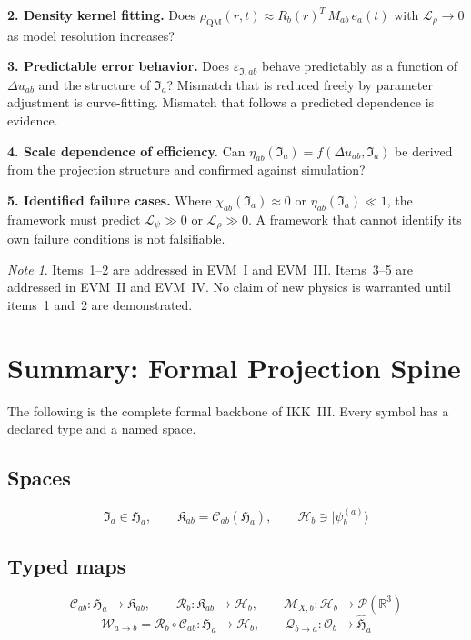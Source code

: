 \documentclass[12pt, a4paper]{article}
\theoremstyle{definition}
\theoremstyle{plain}
\theoremstyle{remark}
\newtheorem{note}{Note}[section]
\newenvironment{evidenceitem}[1]
  {\medskip\noindent\textbf{#1.}\enspace}{\medskip}
\newcommand{\Ia}{\mathfrak{I}_a}
\newcommand{\Ha}{\mathfrak{H}_a}        %
\newcommand{\Hb}{\mathcal{H}_b}         %
\newcommand{\Hahat}{\widehat{\mathfrak{H}}_a}  %
\newcommand{\Kab}{\mathfrak{K}_{ab}}    %
\newcommand{\Osp}{\mathcal{O}_b}        %
\newcommand{\ProbR}{\mathcal{P}(\mathbb{R}^3)} %
\newcommand{\Wab}{\mathcal{W}_{a\to b}}   %
\newcommand{\Qba}{\mathcal{Q}_{b\to a}}   %
\newcommand{\Cab}{\mathcal{C}_{ab}}        %
\newcommand{\Rb}{\mathcal{R}_b}            %
\newcommand{\MXb}{\mathcal{M}_{X,b}}      %
\newcommand{\psiab}{|\psi_b^{(a)}\rangle}
\newcommand{\rhoQM}{\rho_{\mathrm{QM}}}
\newcommand{\chiab}{\chi_{ab}}
\newcommand{\etaab}{\eta_{ab}}
\newcommand{\epsI}{\varepsilon_{\mathfrak{I},ab}}
\newcommand{\Lpsi}{\mathcal{L}_\psi}
\newcommand{\Lrho}{\mathcal{L}_\rho}
\newcommand{\Rbvec}{R_b(r)}
\newcommand{\eavec}{e_a(t)}
\newcommand{\Mab}{M_{ab}}
\newcommand{\Duab}{\Delta u_{ab}}
\begin{document}
\begin{evidenceitem}{2. Density kernel fitting}
Does $\rhoQM(r,t) \approx \Rbvec^T\,\Mab\,\eavec$ with
$\Lrho \to 0$ as model resolution increases?
\end{evidenceitem}

\begin{evidenceitem}{3. Predictable error behavior}
Does $\epsI$ behave predictably as a function of $\Duab$ and
the structure of $\Ia$?
Mismatch that is reduced freely by parameter adjustment is
curve-fitting.
Mismatch that follows a predicted dependence is evidence.
\end{evidenceitem}

\begin{evidenceitem}{4. Scale dependence of efficiency}
Can $\etaab(\Ia) = f(\Duab, \Ia)$ be derived from the projection
structure and confirmed against simulation?
\end{evidenceitem}

\begin{evidenceitem}{5. Identified failure cases}
Where $\chiab(\Ia) \approx 0$ or $\etaab(\Ia) \ll 1$, the
framework must predict $\Lpsi \gg 0$ or $\Lrho \gg 0$.
A framework that cannot identify its own failure conditions is
not falsifiable.
\end{evidenceitem}

\begin{note}
Items~1--2 are addressed in EVM~I and EVM~III.
Items~3--5 are addressed in EVM~II and EVM~IV.
No claim of new physics is warranted until items~1 and~2 are
demonstrated.
\end{note}


\section*{Summary: Formal Projection Spine}

The following is the complete formal backbone of IKK~III.
Every symbol has a declared type and a named space.

\subsection*{Spaces}
\[
  \Ia \in \Ha,
  \qquad
  \Kab = \Cab(\Ha),
  \qquad
  \Hb \ni \psiab
\]

\subsection*{Typed maps}
\[
  \Cab : \Ha \to \Kab,
  \qquad
  \Rb : \Kab \to \Hb,
  \qquad
  \MXb : \Hb \to \ProbR
\]
\[
  \Wab = \Rb \circ \Cab : \Ha \to \Hb,
  \qquad
  \Qba : \Osp \to \Hahat
\]
\end{document}
